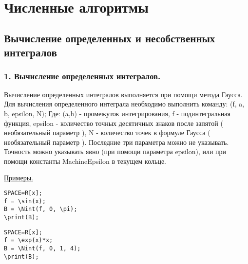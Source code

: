 \chapter{Численные алгоритмы}


\section{Вычисление определенных и несобственных интегралов}

\subsection{1. Вычисление определенных интегралов.}

Вычисление определенных интегралов выполняется при помощи метода Гаусса.
Для вычисления определенного интеграла необходимо выполнить команду:
\Nint(f, a, b, epsilon, N);
Где: 
(a,b) - промежуток интегрирования,
f - подинтегральная функция,
epsilon - количество точных десятичных знаков после запятой ( необязательный параметр ),
N - количество точек в формуле Гаусса ( необязательный параметр ).
Последние три параметра можно не указывать.
Точность можно указывать явно (при помощи параметра epsilon), или при помощи константы MachineEpsilon в текущем кольце.



\underline{Примеры. }

\vspace*{-2mm}
\begin{verbatim}
SPACE=R[x];
f = \sin(x);
B = \Nint(f, 0, \pi); 
\print(B);
\end{verbatim}


\vspace*{-2mm}
\begin{verbatim}
SPACE=R[x];
f = \exp(x)*x;
B = \Nint(f, 0, 1, 4); 
\print(B);
\end{verbatim}



